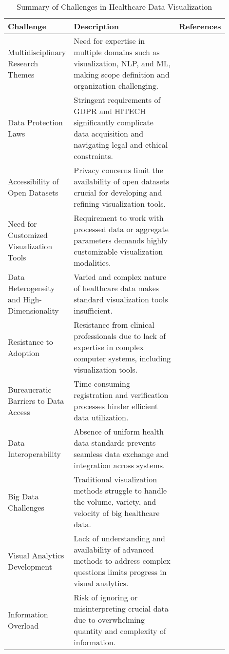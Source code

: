 \begin{table}[ht]
\caption{Summary of Challenges in Healthcare Data Visualization}
\label{tab:healthcare-challenges}
\centering
\begin{tabular}{|p{0.2\linewidth}|p{0.5\linewidth}|p{0.2\linewidth}|}
\hline
\textbf{Challenge} & \textbf{Description} & \textbf{References} \\ \hline
Multidisciplinary Research Themes & Need for expertise in multiple domains such as visualization, NLP, and ML, making scope definition and organization challenging. & \cite{soa9} \\ \hline
Data Protection Laws & Stringent requirements of GDPR and HITECH significantly complicate data acquisition and navigating legal and ethical constraints. & \cite{soa9, soa11, soa10} \\ \hline
Accessibility of Open Datasets & Privacy concerns limit the availability of open datasets crucial for developing and refining visualization tools. & \cite{soa9} \\ \hline
Need for Customized Visualization Tools & Requirement to work with processed data or aggregate parameters demands highly customizable visualization modalities. & \cite{soa12, soa13} \\ \hline
Data Heterogeneity and High-Dimensionality & Varied and complex nature of healthcare data makes standard visualization tools insufficient. & \cite{soa12, soa13} \\ \hline
Resistance to Adoption & Resistance from clinical professionals due to lack of expertise in complex computer systems, including visualization tools. & \cite{soa14} \\ \hline
Bureaucratic Barriers to Data Access & Time-consuming registration and verification processes hinder efficient data utilization. & \cite{soa15} \\ \hline
Data Interoperability & Absence of uniform health data standards prevents seamless data exchange and integration across systems. & \cite{soa21} \\ \hline
Big Data Challenges & Traditional visualization methods struggle to handle the volume, variety, and velocity of big healthcare data. & \cite{soa13} \\ \hline
Visual Analytics Development & Lack of understanding and availability of advanced methods to address complex questions limits progress in visual analytics. & \cite{soa17, soa18} \\ \hline
Information Overload & Risk of ignoring or misinterpreting crucial data due to overwhelming quantity and complexity of information. & \cite{soa19, soa20} \\ \hline
\end{tabular}
\end{table}


